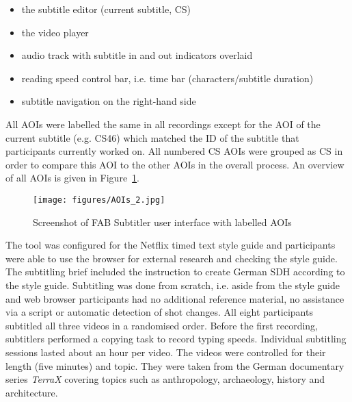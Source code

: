 \documentclass[output=paper]{langscibook}
\begin{document}
\begin{itemize}
\item the subtitle editor (current subtitle, CS)
\item the video player
\item audio track with subtitle in and out indicators overlaid
\item reading speed control bar, i.e.
time bar (characters/subtitle duration)
\item subtitle navigation on the right-hand side
\end{itemize}
All AOIs were labelled the same in all recordings except for the AOI of the current subtitle (e.g.
CS46) which matched the ID of the subtitle that participants currently worked on.
All numbered CS AOIs were grouped as CS in order to compare this AOI to the other AOIs in the overall process.
An overview of all AOIs is given in Figure~\ref{fig:1_AOIs}.

\begin{figure}
\texttt{[image: figures/AOIs\_2.jpg]}
\caption{Screenshot of FAB Subtitler user interface with labelled AOIs\label{fig:1_AOIs}}
\end{figure}

The tool was configured for the Netflix timed text style guide and participants were able to use the browser for external research and checking the style guide.
The subtitling brief included the instruction to create German SDH according to the style guide.
Subtitling was done from scratch, i.e.
aside from the style guide and web browser participants had no additional reference material, no assistance via a script or automatic detection of shot changes.
All eight participants subtitled all three videos in a randomised order.
Before the first recording, subtitlers performed a copying task to record typing speeds.
Individual subtitling sessions lasted about an hour per video.
The videos were controlled for their length (five minutes) and topic.
They were taken from the German documentary series \textit{TerraX} covering topics such as anthropology, archaeology, history and architecture.
\end{document}
